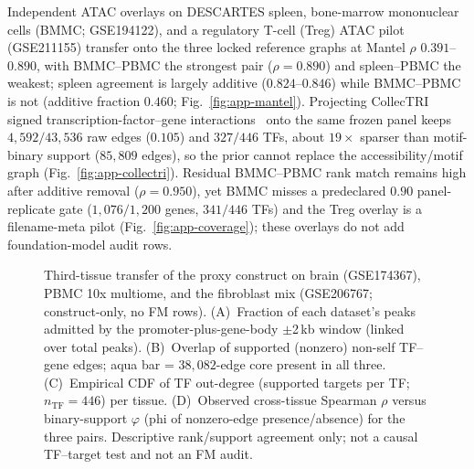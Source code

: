 \documentclass[fleqn,10pt,lineno]{wlpeerj}
\newcommand{\fitfig}[1]{\resizebox{\ifdim\width>\linewidth\linewidth\else\width\fi}{!}{#1}}
\begin{document}
Independent ATAC overlays on DESCARTES spleen, bone-marrow mononuclear cells (BMMC; GSE194122), and a regulatory T-cell (Treg) ATAC pilot (GSE211155) transfer onto the three locked reference graphs at Mantel $\rho$ $0.391$--$0.890$, with BMMC--PBMC the strongest pair ($\rho=0.890$) and spleen--PBMC the weakest; spleen agreement is largely additive ($0.824$--$0.846$) while BMMC--PBMC is not (additive fraction $0.460$; Fig.~\ref{fig:app-mantel}). Projecting CollecTRI signed transcription-factor--gene interactions~\citep{mullerdott2023collectri} onto the same frozen panel keeps $4{,}592/43{,}536$ raw edges ($0.105$) and $327/446$ TFs, about $19\times$ sparser than motif-binary support ($85{,}809$ edges), so the prior cannot replace the accessibility/motif graph (Fig.~\ref{fig:app-collectri}). Residual BMMC--PBMC rank match remains high after additive removal ($\rho=0.950$), yet BMMC misses a predeclared $0.90$ panel-replicate gate ($1{,}076/1{,}200$ genes, $341/446$ TFs) and the Treg overlay is a filename-meta pilot (Fig.~\ref{fig:app-coverage}); these overlays do not add foundation-model audit rows.

\begin{figure}[!tbp]\centering
\fitfig{}
\caption{Third-tissue transfer of the proxy construct on brain (GSE174367), PBMC 10x multiome, and
the fibroblast mix (GSE206767; construct-only, no FM rows). (A)~Fraction of each dataset's peaks
admitted by the promoter-plus-gene-body $\pm$2\,kb window (linked over total peaks). (B)~Overlap
of supported (nonzero) non-self TF--gene edges; aqua bar = $38{,}082$-edge core present in all
three. (C)~Empirical CDF of TF out-degree (supported targets per TF; $n_{\mathrm{TF}}=446$) per
tissue. (D)~Observed cross-tissue Spearman $\rho$ versus binary-support $\varphi$ (phi of
nonzero-edge presence/absence) for the three pairs. Descriptive rank/support agreement only; not
a causal TF--target test and not an FM audit.}\label{fig:third_tissue}
\end{figure}
\end{document}
